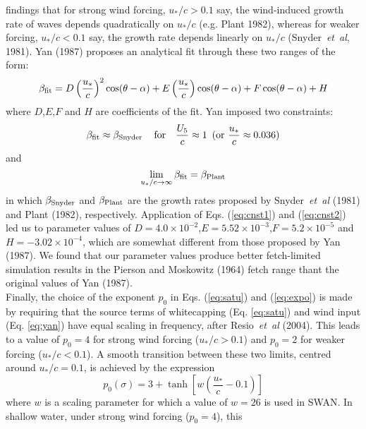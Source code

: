 \documentclass[12pt]{book}
\begin{document}
findings that for strong wind forcing, $u_*/c > 0.1$ say, the wind-induced growth rate of waves depends quadratically on
$u_*/c$ (e.g. Plant 1982), whereas for weaker forcing, $u_*/c < 0.1$ say, the growth rate depends linearly on $u_*/c$
(Snyder~{\it et~al}, 1981). Yan (1987) proposes an analytical fit through these two ranges of the form:
\begin{equation}
  \beta_{\rm fit} = D \left( \frac{u_*}{c} \right)^2 \cos(\theta-\alpha) + E \left( \frac{u_*}{c} \right) \cos(\theta-\alpha) +
                    F \cos(\theta-\alpha) + H
  \label{eq:yan}
\end{equation}
where $D$,$E$,$F$ and $H$ are coefficients of the fit. Yan imposed two constraints:
\begin{equation}
  \beta_{\rm fit} \approx \beta_{\rm Snyder}\, \quad \mbox{for} \quad \frac{U_5}{c} \approx 1\,\,\, (\mbox{or} \,\, \frac{u_*}{c} \approx 0.036)
  \label{eq:cnst1}
\end{equation}
and
\begin{equation}
  \lim \limits_{u_*/c \rightarrow \infty} \beta_{\rm fit} = \beta_{\rm Plant}
  \label{eq:cnst2}
\end{equation}
in which $\beta_{\rm Snyder}$ and $\beta_{\rm Plant}$ are the growth rates proposed by Snyder~{\it et~al} (1981) and Plant (1982), respectively.
Application of Eqs. (\ref{eq:cnst1}) and (\ref{eq:cnst2}) led us to parameter values of $D=4.0 \times 10^{-2}$,$E=5.52 \times 10^{-3}$,$F=5.2 \times 10^{-5}$
and $H=-3.02 \times 10^{-4}$, which are somewhat different from those proposed by Yan (1987). We found that our parameter values produce better
fetch-limited simulation results in the Pierson and Moskowitz (1964) fetch range thant the original values of Yan (1987).
\\[2ex]
\noindent
Finally, the choice of the exponent $p_0$ in Eqs. (\ref{eq:satu}) and (\ref{eq:expo}) is made by requiring that the source terms of whitecapping
(Eq. \ref{eq:satu}) and wind input (Eq. \ref{eq:yan}) have equal scaling in frequency, after Resio~{\it et~al} (2004). This leads to a value of
$p_0 = 4$ for strong wind forcing ($u_*/c > 0.1$) and $p_0 = 2$ for weaker forcing ($u_*/c < 0.1$). A smooth transition between these two limits,
centred around $u_*/c = 0.1$, is achieved by the expression
\begin{equation}
  p_0(\sigma) = 3 + \tanh \left[ w \left( \frac{u_*}{c} - 0.1 \right) \right]
\end{equation}
where $w$ is a scaling parameter for which a value of $w = 26$ is used in SWAN. In shallow water, under strong wind forcing ($p_0=4$), this
\end{document}
